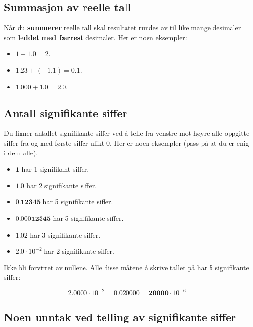 \documentclass[a4paper,9pt]{article}
\begin{document}
\subsection{Summasjon av reelle tall}

Når du \textbf{summerer} reelle tall skal resultatet rundes av til like mange desimaler som\textbf{ leddet med færrest} desimaler. Her er noen eksempler:

\begin{itemize}
\item $1 + 1.0 = 2$.
\item $1.23 + (- 1.1) = 0.1$.
\item $1.000 + 1.0 = 2.0$. 
\end{itemize}



\subsection{Antall signifikante siffer}

Du finner antallet signifikante siffer ved å telle fra venstre mot høyre alle oppgitte siffer fra og med første siffer ulikt 0. Her er noen eksempler (pass på at du er enig i dem alle):

\begin{itemize}
\item $\mathbf{1}$ har 1 signifikant siffer.
\item $\mathbf{1.0}$ har 2 signifikante siffer. 
\item $0.\mathbf{12345}$ har 5 signifikante siffer. 
\item $0.000\mathbf{12345}$ har 5 signifikante siffer. 
\item $\mathbf{1.02}$ har 3 signifikante siffer. 
\item $\mathbf{2.0}\cdot10^{-2}$ har 2 signifikante siffer. 
\end{itemize}

Ikke bli forvirret av nullene. Alle disse måtene å skrive tallet på har 5 signifikante siffer:

\begin{equation}
\mathbf{2.0000}\cdot10^{-2} = 0.020000 = \mathbf{20000}\cdot10^{-6} 
\end{equation}

\subsection{Noen unntak ved telling av signifikante siffer}
\end{document}
